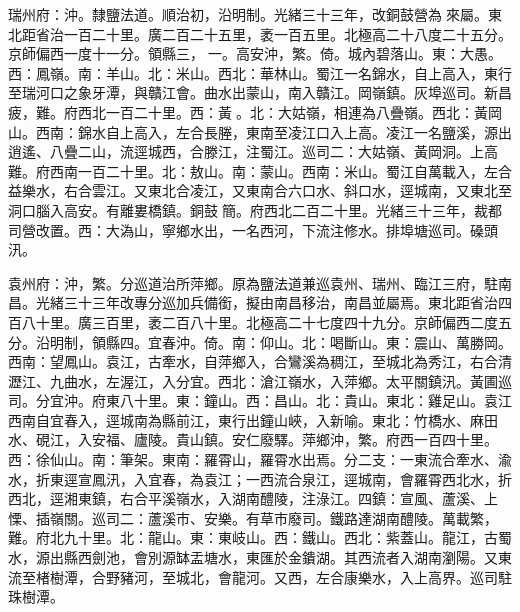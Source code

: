 \begin{pinyinscope}
瑞州府：沖。隸鹽法道。順治初，沿明制。光緒三十三年，改銅鼓營為來屬。東北距省治一百二十里。廣二百二十五里，袤一百五里。北極高二十八度二十五分。京師偏西一度十一分。領縣三，一。高安沖，繁。倚。城內碧落山。東：大愚。西：鳳嶺。南：羊山。北：米山。西北：華林山。蜀江一名錦水，自上高入，東行至瑞河口之象牙潭，與贛江會。曲水出蒙山，南入贛江。岡嶺鎮。灰埠巡司。新昌疲，難。府西北一百二十里。西：黃。北：大姑嶺，相連為八疊嶺。西北：黃岡山。西南：錦水自上高入，左合長塍，東南至凌江口入上高。凌江一名鹽溪，源出逍遙、八疊二山，流逕城西，合滕江，注蜀江。巡司二：大姑嶺、黃岡洞。上高難。府西南一百二十里。北：敖山。南：蒙山。西南：米山。蜀江自萬載入，左合益樂水，右合雲江。又東北合凌江，又東南合六口水、斜口水，逕城南，又東北至洞口腦入高安。有離婁橋鎮。銅鼓簡。府西北二百二十里。光緒三十三年，裁都司營改置。西：大溈山，寧鄉水出，一名西河，下流注修水。排埠塘巡司。磉頭汛。

袁州府：沖，繁。分巡道治所萍鄉。原為鹽法道兼巡袁州、瑞州、臨江三府，駐南昌。光緒三十三年改專分巡加兵備銜，擬由南昌移治，南昌並屬焉。東北距省治四百八十里。廣三百里，袤二百八十里。北極高二十七度四十九分。京師偏西二度五分。沿明制，領縣四。宜春沖。倚。南：仰山。北：喝斷山。東：震山、萬勝岡。西南：望鳳山。袁江，古牽水，自萍鄉入，合鸞溪為稠江，至城北為秀江，右合清瀝江、九曲水，左渥江，入分宜。西北：滄江嶺水，入萍鄉。太平關鎮汛。黃圃巡司。分宜沖。府東八十里。東：鐘山。西：昌山。北：貴山。東北：雞足山。袁江西南自宜春入，逕城南為縣前江，東行出鐘山峽，入新喻。東北：竹橋水、麻田水、硯江，入安福、廬陵。貴山鎮。安仁廢驛。萍鄉沖，繁。府西一百四十里。西：徐仙山。南：筆架。東南：羅霄山，羅霄水出焉。分二支：一東流合牽水、渝水，折東逕宣鳳汛，入宜春，為袁江；一西流合泉江，逕城南，會羅霄西北水，折西北，逕湘東鎮，右合平溪嶺水，入湖南醴陵，注淥江。四鎮：宣風、蘆溪、上慄、插嶺關。巡司二：蘆溪巿、安樂。有草巿廢司。鐵路達湖南醴陵。萬載繁，難。府北九十里。北：龍山。東：東岐山。西：鐵山。西北：紫蓋山。龍江，古蜀水，源出縣西劍池，會別源缽盂塘水，東匯於金鐀湖。其西流者入湖南瀏陽。又東流至楮樹潭，合野豬河，至城北，會龍河。又西，左合康樂水，入上高界。巡司駐珠樹潭。


\end{pinyinscope}
